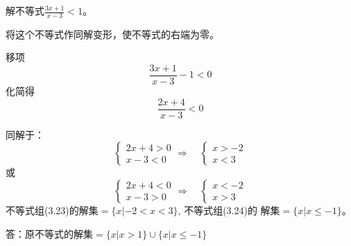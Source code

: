 \begin{example}
    解不等式$\frac{3x+1}{x-3}<1$。
\end{example}

\begin{solution}
    将这个不等式作同解变形，使不等式的右端为零。

    移项$$\frac{3x+1}{x-3}-1<0$$
化简得$$\frac{2x+4}{x-3}<0$$

同解于：
\begin{equation}
    \begin{cases}
        2x+4>0\\x-3<0
    \end{cases}\Rightarrow\quad \begin{cases}
        x>-2\\  x<3
    \end{cases}
\end{equation}
或
\begin{equation}
    \begin{cases}
        2x+4<0\\x-3>0
    \end{cases}\Rightarrow\quad \begin{cases}
        x<-2\\  x>3
    \end{cases}
\end{equation}
不等式组(3.23)的解集$=\{x|-2<x<3\}$, 不等式组(3.24)的
解集$=\{x|x\le -1\}$。

答：原不等式的解集$=\{x|x>1\}\cup \{x|x\le -1\}$

\end{solution}

